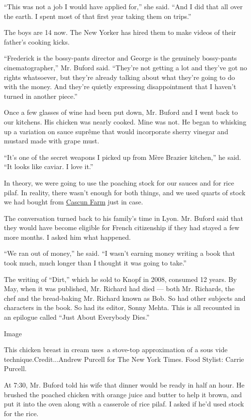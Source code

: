 ``This was not a job I would have applied for,'' she said. ``And I did
that all over the earth. I spent most of that first year taking them on
trips.''

The boys are 14 now. The New Yorker has hired them to make videos of
their father's cooking kicks.

``Frederick is the bossy-pants director and George is the genuinely
bossy-pants cinematographer,'' Mr. Buford said. ``They're not getting a
lot and they've got no rights whatsoever, but they're already talking
about what they're going to do with the money. And they're quietly
expressing disappointment that I haven't turned in another piece.''

Once a few glasses of wine had been put down, Mr. Buford and I went back
to our kitchens. His chicken was nearly cooked. Mine was not. He began
to whisking up a variation on sauce suprême that would incorporate
sherry vinegar and mustard made with grape must.

``It's one of the secret weapons I picked up from Mère Brazier
kitchen,'' he said. ``It looks like caviar. I love it.''

In theory, we were going to use the poaching stock for our sauces and
for rice pilaf. In reality, there wasn't enough for both things, and we
used quarts of stock we had bought from
\href{https://www.cascunfarm.com/}{Cascun Farm} just in case.

The conversation turned back to his family's time in Lyon. Mr. Buford
said that they would have become eligible for French citizenship if they
had stayed a few more months. I asked him what happened.

``We ran out of money,'' he said. ``I wasn't earning money writing a
book that took much, much longer than I thought it was going to take.''

The writing of ``Dirt,'' which he sold to Knopf in 2008, consumed 12
years. By May, when it was published, Mr. Richard had died --- both Mr.
Richards, the chef and the bread-baking Mr. Richard known as Bob. So had
other subjects and characters in the book. So had its editor, Sonny
Mehta. This is all recounted in an epilogue called ``Just About
Everybody Dies.''

Image

This chicken breast in cream uses~a stove-top approximation of a sous
vide technique.Credit...Andrew Purcell for The New York Times. Food
Stylist: Carrie Purcell.

At 7:30, Mr. Buford told his wife that dinner would be ready in half an
hour. He brushed the poached chicken with orange juice and butter to
help it brown, and put it into the oven along with a casserole of rice
pilaf. I asked if he'd used stock for the rice.

